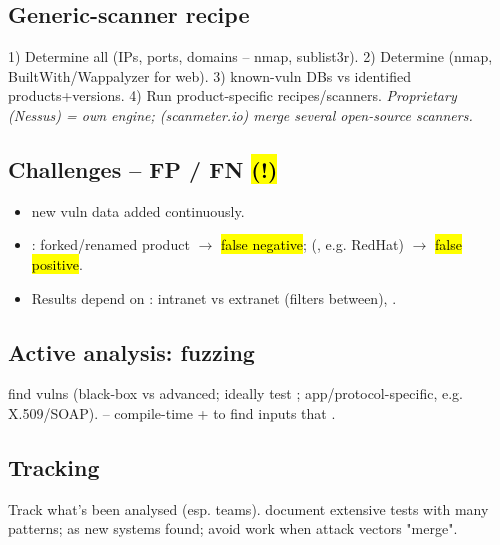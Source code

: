 \subsection{Generic-scanner recipe}
1) Determine all  (IPs, ports, domains -- nmap, sublist3r). 2) Determine  (nmap, BuiltWith/Wappalyzer for web). 3)  known-vuln DBs vs identified products+versions. 4) Run product-specific recipes/scanners. \textit{Proprietary (Nessus) = own engine;  (scanmeter.io) merge several open-source scanners.}

\subsection{Challenges -- FP / FN \hl{(!)}}
\begin{itemize}
\item {} new vuln data added continuously.
\item {}: forked/renamed product $\to$ \hl{false negative};  (, e.g. RedHat) $\to$ \hl{false positive}.
\item Results depend on : intranet vs extranet (filters between), .
\end{itemize}

\subsection{Active analysis: fuzzing}
 find  vulns (black-box vs advanced; ideally test ; app/protocol-specific, e.g. X.509/SOAP).  -- compile-time  +  to find inputs that .

\subsection{Tracking}
Track what's been analysed (esp. teams).  document extensive tests with many patterns;  as new systems found; avoid  work when attack vectors "merge".

